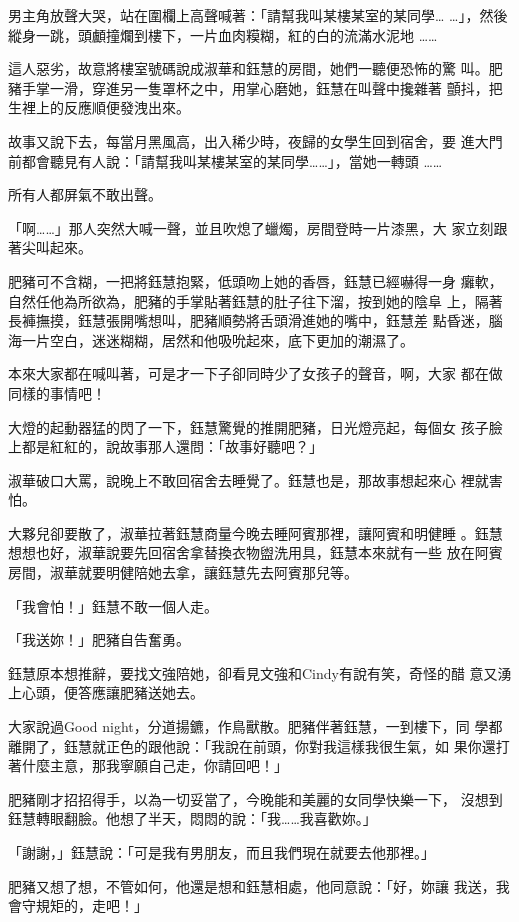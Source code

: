 男主角放聲大哭，站在圍欄上高聲喊著：「請幫我叫某樓某室的某同學…
…」，然後縱身一跳，頭顱撞爛到樓下，一片血肉糢糊，紅的白的流滿水泥地
……

這人惡劣，故意將樓室號碼說成淑華和鈺慧的房間，她們一聽便恐怖的驚
叫。肥豬手掌一滑，穿進另一隻罩杯之中，用掌心磨她，鈺慧在叫聲中攙雜著
顫抖，把生裡上的反應順便發洩出來。

故事又說下去，每當月黑風高，出入稀少時，夜歸的女學生回到宿舍，要
進大門前都會聽見有人說：「請幫我叫某樓某室的某同學……」，當她一轉頭
……

所有人都屏氣不敢出聲。

「啊……」那人突然大喊一聲，並且吹熄了蠟燭，房間登時一片漆黑，大
家立刻跟著尖叫起來。

肥豬可不含糊，一把將鈺慧抱緊，低頭吻上她的香唇，鈺慧已經嚇得一身
癱軟，自然任他為所欲為，肥豬的手掌貼著鈺慧的肚子往下溜，按到她的陰阜
上，隔著長褲撫摸，鈺慧張開嘴想叫，肥豬順勢將舌頭滑進她的嘴中，鈺慧差
點昏迷，腦海一片空白，迷迷糊糊，居然和他吸吮起來，底下更加的潮濕了。

本來大家都在喊叫著，可是才一下子卻同時少了女孩子的聲音，啊，大家
都在做同樣的事情吧！

大燈的起動器猛的閃了一下，鈺慧驚覺的推開肥豬，日光燈亮起，每個女
孩子臉上都是紅紅的，說故事那人還問：「故事好聽吧？」

淑華破口大罵，說晚上不敢回宿舍去睡覺了。鈺慧也是，那故事想起來心
裡就害怕。

大夥兒卻要散了，淑華拉著鈺慧商量今晚去睡阿賓那裡，讓阿賓和明健睡
。鈺慧想想也好，淑華說要先回宿舍拿替換衣物盥洗用具，鈺慧本來就有一些
放在阿賓房間，淑華就要明健陪她去拿，讓鈺慧先去阿賓那兒等。

「我會怕！」鈺慧不敢一個人走。

「我送妳！」肥豬自告奮勇。

鈺慧原本想推辭，要找文強陪她，卻看見文強和Cindy有說有笑，奇怪的醋
意又湧上心頭，便答應讓肥豬送她去。

大家說過Good night，分道揚鑣，作鳥獸散。肥豬伴著鈺慧，一到樓下，同
學都離開了，鈺慧就正色的跟他說：「我說在前頭，你對我這樣我很生氣，如
果你還打著什麼主意，那我寧願自己走，你請回吧！」

肥豬剛才招招得手，以為一切妥當了，今晚能和美麗的女同學快樂一下，
沒想到鈺慧轉眼翻臉。他想了半天，悶悶的說：「我……我喜歡妳。」

「謝謝，」鈺慧說：「可是我有男朋友，而且我們現在就要去他那裡。」

肥豬又想了想，不管如何，他還是想和鈺慧相處，他同意說：「好，妳讓
我送，我會守規矩的，走吧！」

